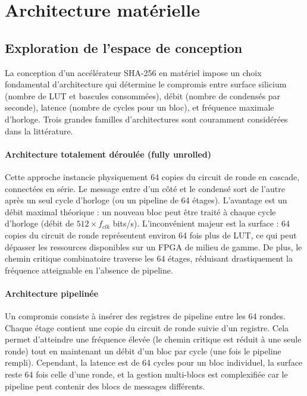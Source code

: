 \section{Architecture matérielle}
\label{sec:archi}

\subsection{Exploration de l'espace de conception}

La conception d'un accélérateur SHA-256 en matériel impose un choix fondamental d'architecture qui détermine le compromis entre surface silicium (nombre de LUT et bascules consommées), débit (nombre de condensés par seconde), latence (nombre de cycles pour un bloc), et fréquence maximale d'horloge. Trois grandes familles d'architectures sont couramment considérées dans la littérature.

\paragraph{Architecture totalement déroulée (fully unrolled)} Cette approche instancie physiquement 64 copies du circuit de ronde en cascade, connectées en série. Le message entre d'un côté et le condensé sort de l'autre après un seul cycle d'horloge (ou un pipeline de 64 étages). L'avantage est un débit maximal théorique : un nouveau bloc peut être traité à chaque cycle d'horloge (débit de $512 \times f_{clk}$ bits/s). L'inconvénient majeur est la surface : 64 copies du circuit de ronde représentent environ 64 fois plus de LUT, ce qui peut dépasser les ressources disponibles sur un FPGA de milieu de gamme. De plus, le chemin critique combinatoire traverse les 64 étages, réduisant drastiquement la fréquence atteignable en l'absence de pipeline.

\paragraph{Architecture pipelinée} Un compromis consiste à insérer des registres de pipeline entre les 64 rondes. Chaque étage contient une copie du circuit de ronde suivie d'un registre. Cela permet d'atteindre une fréquence élevée (le chemin critique est réduit à une seule ronde) tout en maintenant un débit d'un bloc par cycle (une fois le pipeline rempli). Cependant, la latence est de 64 cycles pour un bloc individuel, la surface reste 64 fois celle d'une ronde, et la gestion multi-blocs est complexifiée car le pipeline peut contenir des blocs de messages différents.

